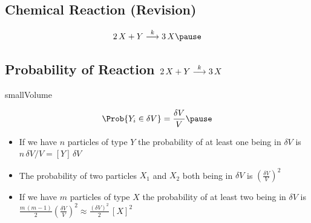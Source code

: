 
\begin{slide}
\section[-2.5]{Chemical Reaction (Revision)}

\pb
\begin{align*}
  2\,X + Y \goesto{k} 3 \, X\pause
\end{align*}
\begin{center}
  \pause
\end{center}
\end{slide}


\begin{slide}
\section[-2]{Probability of Reaction $2\,X + Y \stackrel{k}{\longrightarrow} 3 \,X$}

\begin{leftImage}[0.4]{smallVolume}
  \begin{PauseHighLight}
    \begin{align*}
      \Prob{Y_i \in \delta V} = \frac{\delta V}{V}\pause
    \end{align*}
    \begin{itemize}
    \item If we have $n$ particles of type $Y$ the probability of at
      least one being in $\delta V$ is
      $n\,\delta V/V = [Y]\,\delta V$\pause
    \end{itemize}
  \end{PauseHighLight}
\end{leftImage}
\begin{PauseHighLight}
  \begin{itemize}
  \item The probability of two particles $X_1$ and $X_2$ both being in
    $\delta V$ is $\left(\frac{\delta V}{V}\right)^2$\pause
  \item If we have $m$ particles of type $X$ the probability of at
    least 
    two being in $\delta V$ is $\frac{m\,(m-1)}{2}\left(\frac{\delta
        V}{V}\right)^2\approx \frac{(\delta V)^2}{2}\,[X]^2$\pause 
  \end{itemize}
\end{PauseHighLight}


\end{slide}

